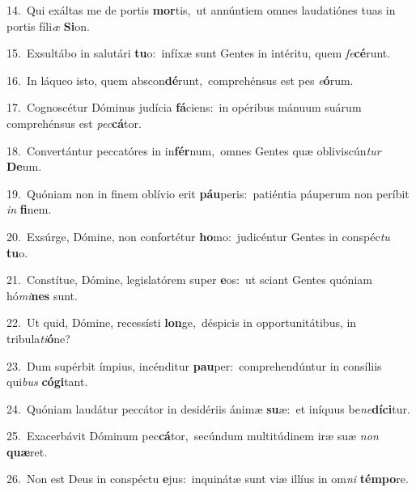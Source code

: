 {\numbfont\textcolor{\numbcolor}{14.}}~Qui exáltas me de portis \textbf{mor}\-tis,~\star ut annúntiem omnes laudatiónes tuas in portis fíli\textit{æ} \textbf{Si}\-on.\par
{\numbfont\textcolor{\numbcolor}{15.}}~Exsultábo in salutári \textbf{tu}\-o:~\star infíxæ sunt Gentes in intéritu, quem \textit{fe}\-\textbf{cé}runt.\par
{\numbfont\textcolor{\numbcolor}{16.}}~In láqueo isto, quem abscon\-\textbf{dé}\-runt,~\star comprehénsus est pes \textit{e}\-\textbf{ó}rum.\par
{\numbfont\textcolor{\numbcolor}{17.}}~Cognoscétur Dóminus judícia \textbf{fá}\-ciens:~\star in opéribus mánuum suárum comprehénsus est \textit{pec}\-\textbf{cá}tor.\par
{\numbfont\textcolor{\numbcolor}{18.}}~Convertántur peccatóres in in\-\textbf{fér}\-num,~\star omnes Gentes quæ obliviscún\textit{tur} \textbf{De}\-um.\par
{\numbfont\textcolor{\numbcolor}{19.}}~Quóniam non in finem oblívio erit \textbf{páu}\-peris:~\star patiéntia páuperum non períbit \textit{in} \textbf{fi}\-nem.\par
{\numbfont\textcolor{\numbcolor}{20.}}~Exsúrge, Dómine, non confortétur \textbf{ho}\-mo:~\star judicéntur Gentes in conspéc\textit{tu} \textbf{tu}\-o.\par
{\numbfont\textcolor{\numbcolor}{21.}}~Constítue, Dómine, legislatórem super \textbf{e}\-os:~\star ut sciant Gentes quóniam hó\-\textit{mi}\-\textbf{nes} sunt.\par
{\numbfont\textcolor{\numbcolor}{22.}}~Ut quid, Dómine, recessísti \textbf{lon}\-ge,~\star déspicis in opportunitátibus, in tribula\-\textit{ti}\-\textbf{ó}ne?\par
{\numbfont\textcolor{\numbcolor}{23.}}~Dum supérbit ímpius, incénditur \textbf{pau}\-per:~\star comprehendúntur in consíliis qui\textit{bus} \textbf{có}\-\textbf{gi}tant.\par
{\numbfont\textcolor{\numbcolor}{24.}}~Quóniam laudátur peccátor in desidériis ánimæ \textbf{su}\-æ:~\star et iníquus be\-\textit{ne}\-\textbf{dí}\textbf{ci}tur.\par
{\numbfont\textcolor{\numbcolor}{25.}}~Exacerbávit Dóminum pec\-\textbf{cá}\-tor,~\star secúndum multitúdinem iræ suæ \textit{non} \textbf{quæ}\-ret.\par
{\numbfont\textcolor{\numbcolor}{26.}}~Non est Deus in conspéctu \textbf{e}\-jus:~\star inquinátæ sunt viæ illíus in om\textit{ni} \textbf{tém}\-\textbf{po}re.\par
